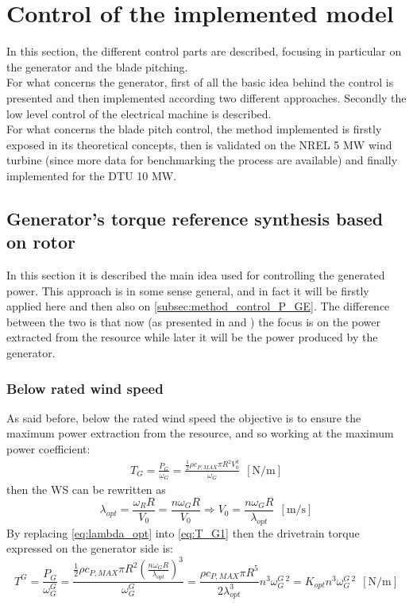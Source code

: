 \newpage
\section{Control of the implemented model}\label{sec:c_basic_model_control}
In this section, the different control parts are described, focusing in particular on the generator and the blade pitching. \\
For what concerns the generator, first of all the basic idea behind the control is presented and then implemented according two different approaches. Secondly the low level control of the electrical machine is described.\\
For what concerns the blade pitch control, the method implemented is firstly exposed in its theoretical concepts, then is validated on the NREL 5 MW wind turbine (since more data for benchmarking the process are available) and finally implemented for the DTU 10 MW.   

\subsection{Generator's torque reference synthesis based on rotor}\label{subsec:torque_reference}
In this section it is described the main idea used for controlling the generated power. This approach is in some sense general, and in fact it will be firstly applied here and then also on \autoref{subsec:method_control_P_GE}. The difference between the two is that now (as presented in \cite{Aerodynamics_of_wind_turbines} and \cite{SMILDEN2016386}) the focus is on the power extracted from the resource while later it will be the power produced by the generator.

\subsubsection{Below rated wind speed}
As said before, below the rated wind speed the objective is to ensure the maximum power extraction from the resource, and so working at the maximum power coefficient:
\begin{gather}
    T_G=\frac{P_G}{\omega_G}=\frac{\frac{1}{2}\rho c_{P,MAX} \pi R^2 V_0^3}{\omega_G} \ \ \left[\si{\newton\per\meter}\right]
    \label{eq:T_G1}
\end{gather}
then the \acrshort{WS} can be rewritten as
\begin{equation}
    \lambda_{opt} = \frac{\omega_R R}{V_0} = \frac{n \omega_G R}{V_0} \Rightarrow V_0=\frac{n\omega_G R}{\lambda_{opt}}  \ \ \left[\si{\meter\per\second}\right]
    \label{eq:lambda_opt}
\end{equation}
By replacing \autoref{eq:lambda_opt} into \autoref{eq:T_G1} then the drivetrain torque expressed on the generator side is:
\begin{equation}
    T^G=\frac{P_G}{\omega_G^G}=\frac{\frac{1}{2}\rho c_{P,MAX} \pi R^2 \left(\frac{n\omega_G R}{\lambda_{opt}}\right)^3}{\omega_G^G} = \frac{\rho c_{P, MAX} \pi R^5 }{2 \lambda_{opt}^3}n^3\omega_G^{G \ 2} = K_{opt}n^3\omega_G^{G \ 2}  \ \ \left[\si{\newton\per\meter}\right]
    \label{eq:T_G2}
\end{equation}

